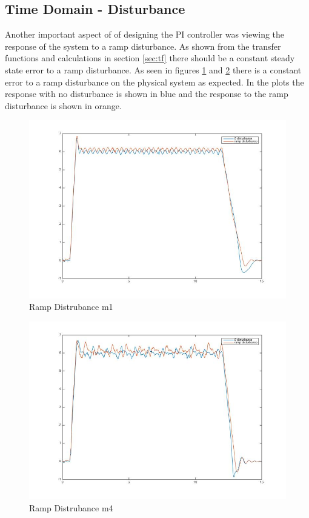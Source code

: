 \documentclass[11pt,titlepage]{article}
\begin{document}
    \subsection{Time Domain - Disturbance} \label{sub:dist}
    Another important aspect of of designing the PI controller was viewing the response of the system to a ramp disturbance. As shown from the transfer functions and calculations in section \ref{sec:tf} there should be a constant steady state error to a ramp disturbance. As seen in figures \ref{fig:distm1} and \ref{fig:distm4} there is a constant error to a ramp disturbance on the physical system as expected. In the plots the response with no disturbance is shown in blue and the response to the ramp disturbance is shown in orange.
    \begin{figure}[H]
        \centering
        \includegraphics[scale=.5]{m1dist}
        \caption{Ramp Distrubance m1}
        \label{fig:distm1}
    \end{figure} 
    \begin{figure}[H]
        \centering
        \includegraphics[scale=.5]{m4dist}
        \caption{Ramp Distrubance m4}
        \label{fig:distm4}
    \end{figure} 
\end{document}
